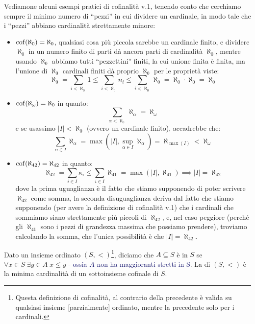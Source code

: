 \begin{example}
	Vediamone alcuni esempi pratici di cofinalit\`a v.1, tenendo conto che cerchiamo sempre il minimo numero di ``pezzi'' in cui dividere un cardinale, in modo tale che i ``pezzi'' abbiano cardinalit\`a strettamente minore:
	\begin{itemize}
		\item $\operatorname{cof}(\aleph_0) = \aleph_0$, qualsiasi cosa pi\`u piccola sarebbe un cardinale finito, e dividere $\aleph_0$ in un numero finito di parti d\`a ancora parti di cardinalit\`a $\aleph_0$, mentre usando $\aleph_0$ abbiamo tutti ``pezzettini'' finiti, la cui unione finita \`e finita, ma l'unione di $\aleph_0$ cardinali finiti d\`a proprio $\aleph_0$ per le propriet\`a viste:
		\[ \aleph_0 = \sum_{i < \aleph_0} 1 \leq \sum_{i < \aleph_0} n_i \leq \sum_{i < \aleph_0} \aleph_0 = \aleph_0 \cdot \aleph_0 = \aleph_0
			\]
		\item $\operatorname{cof}(\aleph_\omega) = \aleph_0$ in quanto:
		\[ \sum_{\alpha < \aleph_0} \aleph_\alpha = \aleph_\omega
			\]
		e se usassimo $|I|<\aleph_0$ (ovvero un cardinale finito), accadrebbe che:
		\[\sum_{\alpha \in I} \aleph_\alpha = \max\left(|I|,\sup_{\alpha \in I} \aleph_\alpha\right) = \aleph_{\max(I)} < \aleph_\omega
		\]
		\item $\operatorname{cof}(\aleph_{42}) = \aleph_{42}$ in quanto:
		\[ \aleph_{42} = \sum_{i \in I} \kappa_i \leq \sum_{i \in I} \aleph_{41} = \max\left(|I|,\aleph_{41}\right) \implies |I| = \aleph_{42}
			\]
		dove la prima uguaglianza \`e il fatto che stiamo supponendo di poter scrivere $\aleph_{42}$ come somma, la seconda disuguaglianza deriva dal fatto che stiamo supponendo (per avere la definizione di cofinalit\`a v.1) che i cardinali che sommiamo siano strettamente pi\`u piccoli di $\aleph_{42}$, e, nel caso peggiore (perch\'e gli $\aleph_{41}$ sono i pezzi di
		grandezza massima che possiamo prendere), troviamo calcolando la somma, che 
		l'unica possibilit\`a \`e che $|I| = \aleph_{42}$.
	\end{itemize}
\end{example}

\begin{definition}[Cofinalit\`a - v.2]
	Dato un insieme ordinato $(S,<)$\footnote{Questa definizione di cofinalit\`a, al contrario della precedente \`e valida su qualsiasi insieme [parzialmente] ordinato, mentre la
	precedente solo per i cardinali.}, diciamo che $A\subseteq S$ \`e  in $S$ se $\forall x \in S \; \exists y \in A \; x \leq y$ \textcolor{MidnightBlue}{- ossia $A$ non 
	ha maggioranti stretti in S}. La  di $(S,<)$ \`e la minima cardinalit\`a di un sottoinsieme cofinale di $S$.
\end{definition}


